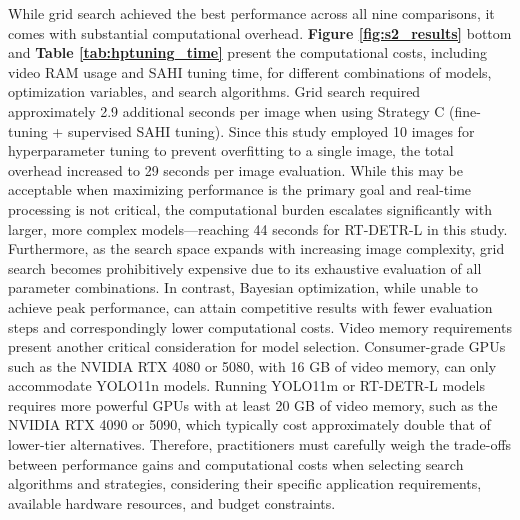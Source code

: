 While grid search achieved the best performance across all nine comparisons, it comes with substantial computational overhead. \textbf{Figure \ref{fig:s2_results}} bottom and \textbf{Table \ref{tab:hptuning_time}} present the computational costs, including video RAM usage and SAHI tuning time, for different combinations of models, optimization variables, and search algorithms.
Grid search required approximately 2.9 additional seconds per image when using Strategy C (fine-tuning + supervised SAHI tuning). Since this study employed 10 images for hyperparameter tuning to prevent overfitting to a single image, the total overhead increased to 29 seconds per image evaluation. While this may be acceptable when maximizing performance is the primary goal and real-time processing is not critical, the computational burden escalates significantly with larger, more complex models—reaching 44 seconds for RT-DETR-L in this study.
Furthermore, as the search space expands with increasing image complexity, grid search becomes prohibitively expensive due to its exhaustive evaluation of all parameter combinations. In contrast, Bayesian optimization, while unable to achieve peak performance, can attain competitive results with fewer evaluation steps and correspondingly lower computational costs.
Video memory requirements present another critical consideration for model selection. Consumer-grade GPUs such as the NVIDIA RTX 4080 or 5080, with 16 GB of video memory, can only accommodate YOLO11n models. Running YOLO11m or RT-DETR-L models requires more powerful GPUs with at least 20 GB of video memory, such as the NVIDIA RTX 4090 or 5090, which typically cost approximately double that of lower-tier alternatives.
Therefore, practitioners must carefully weigh the trade-offs between performance gains and computational costs when selecting search algorithms and strategies, considering their specific application requirements, available hardware resources, and budget constraints.



